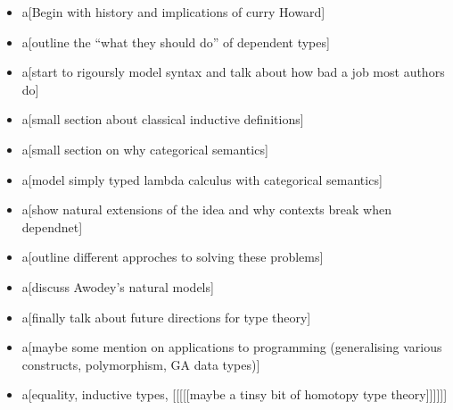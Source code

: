 \begin{itemize}
\item a[Begin with history and implications of curry Howard]

\item a[outline the ``what they should do'' of dependent types]

\item a[start to rigoursly model syntax and talk about how bad a job most authors do]

\item a[small section about classical inductive definitions]

\item a[small section on why categorical semantics]

\item a[model simply typed lambda calculus with categorical semantics]

\item a[show natural extensions of the idea and why contexts break when dependnet]

\item a[outline different approches to solving these problems]

\item a[discuss Awodey's natural models]

\item a[finally talk about future directions for type theory]

\item a[maybe some mention on applications to programming (generalising various constructs, polymorphism, GA data types)]

\item a[equality, inductive types, [[[[[maybe a tinsy bit of homotopy type theory]]]]]]
\end{itemize}


